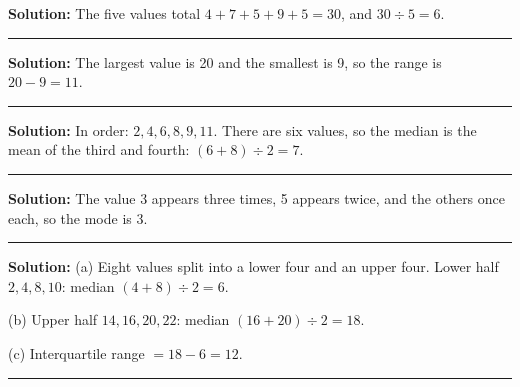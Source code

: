 \documentclass[12pt]{article}
\begin{document}



\textbf{Solution:} The five values total $4 + 7 + 5 + 9 + 5 = 30$, and
$30 \div 5 = 6$. 

\vspace{0.22cm}\noindent\rule{\linewidth}{0.2pt}\vspace{0.22cm}


\textbf{Solution:} The largest value is 20 and the smallest is 9, so the range
is $20 - 9 = 11$. 

\vspace{0.22cm}\noindent\rule{\linewidth}{0.2pt}\vspace{0.22cm}


\textbf{Solution:} In order: $2, 4, 6, 8, 9, 11$. There are six values, so the
median is the mean of the third and fourth: $(6 + 8) \div 2 = 7$. 

\vspace{0.22cm}\noindent\rule{\linewidth}{0.2pt}\vspace{0.22cm}


\textbf{Solution:} The value 3 appears three times, 5 appears twice, and the
others once each, so the mode is 3. 

\vspace{0.22cm}\noindent\rule{\linewidth}{0.2pt}\vspace{0.22cm}


\textbf{Solution:} (a) Eight values split into a lower four and an upper four.
Lower half $2, 4, 8, 10$: median $(4 + 8) \div 2 = 6$. 

(b) Upper half $14, 16, 20, 22$: median $(16 + 20) \div 2 = 18$. 

(c) Interquartile range $= 18 - 6 = 12$. 

\vspace{0.22cm}\noindent\rule{\linewidth}{0.2pt}\vspace{0.22cm}

\end{document}
